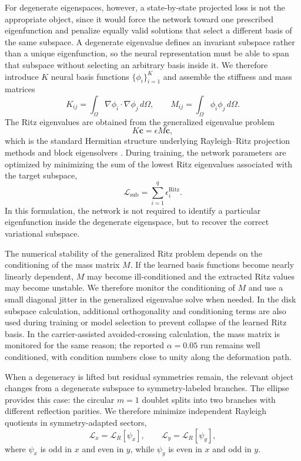 \documentclass[10pt,onecolumn]{article}
\begin{document}
For degenerate eigenspaces, however, a state-by-state projected loss is not the appropriate object, since it would force the network toward one prescribed eigenfunction and penalize equally valid solutions that select a different basis of the same subspace. A degenerate eigenvalue defines an invariant subspace rather than a unique eigenfunction, so the neural representation must be able to span that subspace without selecting an arbitrary basis inside it. We therefore introduce $K$ neural basis functions $\{\phi_i\}_{i=1}^K$ and assemble the stiffness and mass matrices
\begin{equation}
K_{ij}
=
\int_\Omega
\nabla \phi_i\cdot \nabla \phi_j\,d\Omega,
\qquad
M_{ij}
=
\int_\Omega
\phi_i\phi_j\,d\Omega.
\end{equation}
The Ritz eigenvalues are obtained from the generalized eigenvalue problem
\begin{equation}
K\mathbf{c}=\epsilon M\mathbf{c},
\end{equation}
which is the standard Hermitian structure underlying Rayleigh--Ritz projection methods and block eigensolvers \cite{Parlett1998,Bai2000,Knyazev2001}. During training, the network parameters are optimized by minimizing the sum of the lowest Ritz eigenvalues associated with the target subspace,
\begin{equation}
\mathcal{L}_{\mathrm{sub}}
=
\sum_{i=1}^{q}
\epsilon_i^{\mathrm{Ritz}}.
\label{eq:subloss}
\end{equation}
In this formulation, the network is not required to identify a particular eigenfunction inside the degenerate eigenspace, but to recover the correct variational subspace.

The numerical stability of the generalized Ritz problem depends on the conditioning of the mass matrix $M$. If the learned basis functions become nearly linearly dependent, $M$ may become ill-conditioned and the extracted Ritz values may become unstable. We therefore monitor the conditioning of $M$ and use a small diagonal jitter in the generalized eigenvalue solve when needed. In the disk subspace calculation, additional orthogonality and conditioning terms are also used during training or model selection to prevent collapse of the learned Ritz basis. In the carrier-assisted avoided-crossing calculation, the mass matrix is monitored for the same reason; the reported $\alpha=0.05$ run remains well conditioned, with condition numbers close to unity along the deformation path.

When a degeneracy is lifted but residual symmetries remain, the relevant object changes from a degenerate subspace to symmetry-labeled branches. The ellipse provides this case: the circular $m=1$ doublet splits into two branches with different reflection parities. We therefore minimize independent Rayleigh quotients in symmetry-adapted sectors,
\begin{equation}
\mathcal{L}_{x}
=
\mathcal{L}_{R}[\psi_x],
\qquad
\mathcal{L}_{y}
=
\mathcal{L}_{R}[\psi_y],
\end{equation}
where $\psi_x$ is odd in $x$ and even in $y$, while $\psi_y$ is even in $x$ and odd in $y$.
\end{document}
